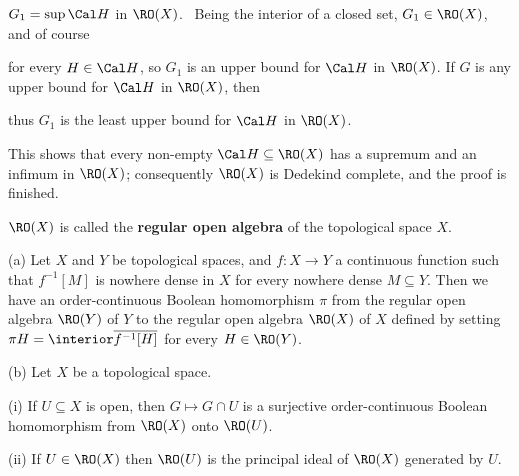 {$G_1=\sup\Cal H$ in $\RO(X)$.   \Prf\ Being the interior of a closed
set, $G_1\in\RO(X)$, and of course


\noindent for every $H\in\Cal H$, so $G_1$ is an upper bound for
$\Cal H$ in $\RO(X)$.   If $G$ is any upper bound for $\Cal H$ in $\RO(X)$, then


\noindent thus $G_1$ is the least upper bound for $\Cal H$ in
$\RO(X)$.\ \Qed

This shows that every non-empty $\Cal H\subseteq\RO(X)$ has a supremum
and an infimum in $\RO(X)$;  consequently $\RO(X)$ is Dedekind
complete, and the proof is finished.
}%

 $\RO(X)$ is called the
{\bf regular open algebra} of the topological space $X$.


 (a) Let $X$ and $Y$ be topological spaces, and
$f:X\to Y$ a continuous function such that $f^{-1}[M]$ is nowhere dense
in $X$ for every nowhere dense $M\subseteq Y$.   Then we have an
order-continuous Boolean homomorphism $\pi$ from the regular open
algebra $\RO(Y)$ of $Y$ to the regular open algebra $\RO(X)$ of $X$
defined by setting $\pi H=\interior\overline{f^{-1}[H]}$ for every
$H\in\RO(Y)$.

(b) Let $X$ be a topological space.

\quad(i) If $U\subseteq X$ is open, then $G\mapsto G\cap U$ is a surjective
order-continuous Boolean homomorphism from $\RO(X)$ onto $\RO(U)$.

\quad(ii) If $U\in\RO(X)$ then $\RO(U)$ is the principal ideal of $\RO(X)$
generated by $U$.

